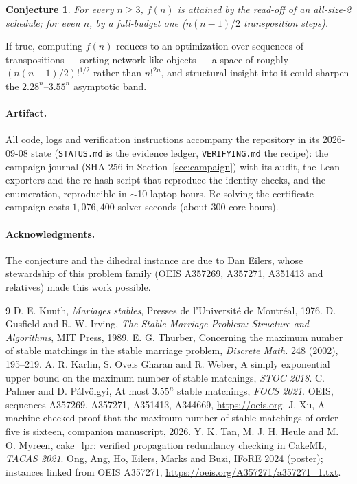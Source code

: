\documentclass[11pt]{article}
\newtheorem{conjecture}{Conjecture}
\begin{document}
\begin{conjecture}\label{conj:size2}
For every $n\ge 3$, $f(n)$ is attained by the read-off of an all-size-2 schedule;
for even $n$, by a full-budget one ($n(n-1)/2$ transposition steps).
\end{conjecture}

If true, computing $f(n)$ reduces to an optimization over sequences of
transpositions --- sorting-network-like objects --- a space of roughly
$(n(n-1)/2)!^{1/2}$ rather than $n!^{2n}$, and structural insight into it could
sharpen the $2.28^n$--$3.55^n$ asymptotic band.

\paragraph{Artifact.} All code, logs and verification instructions accompany the repository in
its 2026-09-08 state (\texttt{STATUS.md} is the evidence ledger, \texttt{VERIFYING.md} the
recipe):
the campaign journal (SHA-256 in Section~\ref{sec:campaign}) with its audit, the Lean exporters and
the re-hash script that reproduce the identity checks, and the enumeration, reproducible in
$\sim$10 laptop-hours. Re-solving the certificate campaign costs $1{,}076{,}400$ solver-seconds
(about $300$ core-hours).

\paragraph{Acknowledgments.} The conjecture and the dihedral instance are due to Dan Eilers, whose
stewardship of this problem family (OEIS A357269, A357271, A351413 and relatives) made this work
possible.

\begin{thebibliography}{9}
 D. E. Knuth, \emph{Mariages stables}, Presses de l'Universit\'e de Montr\'eal, 1976.
 D. Gusfield and R. W. Irving, \emph{The Stable Marriage Problem: Structure and
Algorithms}, MIT Press, 1989.
 E. G. Thurber, Concerning the maximum number of stable matchings in the stable
marriage problem, \emph{Discrete Math.} 248 (2002), 195--219.
 A. R. Karlin, S. Oveis Gharan and R. Weber, A simply exponential upper bound on the
maximum number of stable matchings, \emph{STOC 2018}.
 C. Palmer and D. P\'alv\"olgyi, At most $3.55^n$ stable matchings, \emph{FOCS 2021}.
 OEIS, sequences A357269, A357271, A351413, A344669, \url{https://oeis.org}.
 J. Xu, A machine-checked proof that the maximum number of stable matchings of
order five is sixteen, companion manuscript, 2026.
 Y. K. Tan, M. J. H. Heule and M. O. Myreen, cake\_lpr: verified propagation
redundancy checking in CakeML, \emph{TACAS 2021}.
 Ong, Ang, Ho, Eilers, Marks and Buzi, IFoRE 2024 (poster); instances linked from
OEIS A357271, \url{https://oeis.org/A357271/a357271_1.txt}.
\end{thebibliography}
\end{document}
